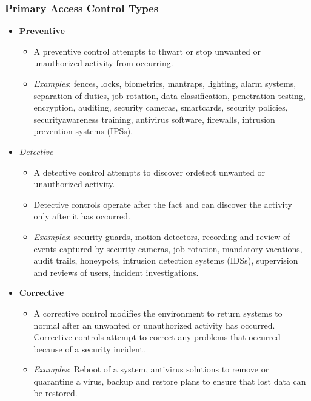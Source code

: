\subsubsection{Primary Access Control Types}
\begin{itemize}
    \item \textbf{Preventive}
    \begin{itemize}
        \item A preventive control attempts to thwart or stop unwanted or unauthorized activity from occurring.
        \item \textit{Examples}: fences, locks, biometrics, mantraps, lighting, alarm systems, separation of duties, job rotation, data classification, penetration testing, encryption, auditing, security cameras, smartcards, security policies, securityawareness training, antivirus software, firewalls, intrusion prevention systems (IPSs).
    \end{itemize}
    \item \textit{Detective}
    \begin{itemize}
        \item  A detective control attempts to discover ordetect unwanted or unauthorized activity.
        \item Detective controls operate after the fact and can discover the activity only after it has occurred.
        \item \textit{Examples}: security guards, motion detectors, recording and review of events captured by security cameras, job rotation, mandatory vacations, audit trails, honeypots, intrusion detection systems (IDSs), supervision and reviews of users, incident investigations.
    \end{itemize}
    \item \textbf{Corrective}
    \begin{itemize}
        \item A corrective control modifies the environment to return systems to normal after an unwanted or unauthorized activity has occurred. Corrective controls attempt to correct any problems that occurred because of a security incident.
        \item \textit{Examples}: Reboot of a system, antivirus solutions to remove or quarantine a virus, backup and restore plans to ensure that lost data can be restored.
    \end{itemize}
\end{itemize}

